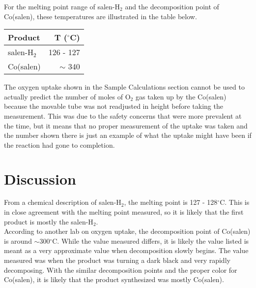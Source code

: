 \documentclass[11pt]{article}
\newcommand{\super}[1]{\ensuremath{^{\textrm{#1}}}}
\newcommand{\sub}[1]{\ensuremath{_{\textrm{#1}}}}
\begin{document}
For the melting point range of salen-H\sub{2} and the decomposition point of Co(salen), these temperatures are illustrated in the table below.

\begin{center}
\begin{tabular}{|l|r|}
\hline
\textbf{Product} & \textbf{T  (\super{$\circ$}C}) \\
\hline
salen-H\sub{2} & 126 - 127 \\
Co(salen) & $\sim$ 340 \\
\hline
\end{tabular}
\end{center}

The oxygen uptake shown in the Sample Calculations section cannot be used to actually predict the number of moles of O\sub{2} gas taken up by the Co(salen) because the movable tube was not readjusted in height before taking the measurement. This was due to the safety concerns that were more prevalent at the time, but it means that no proper measurement of the uptake was taken and the number shown there is just an example of what the uptake might have been if the reaction had gone to completion.


\section{Discussion}
From a chemical description of salen-H\sub{2},\cite{salenh2} the melting point is 127 - 128\super{$\circ$}C. This is in close agreement with the melting point measured, so it is likely that the first product is mostly the salen-H\sub{2}. \\

According to another lab on oxygen uptake,\cite{cosalen} the decomposition point of Co(salen) is around $\sim$300\super{$\circ$}C. While the value measured differs, it is likely the value listed is meant as a very approximate value when decomposition slowly begins. The value measured was when the product was turning a dark black and very rapidly decomposing. With the similar decomposition points and the proper color for Co(salen), it is likely that the product synthesized was mostly Co(salen).




\raggedright




\end{document}
